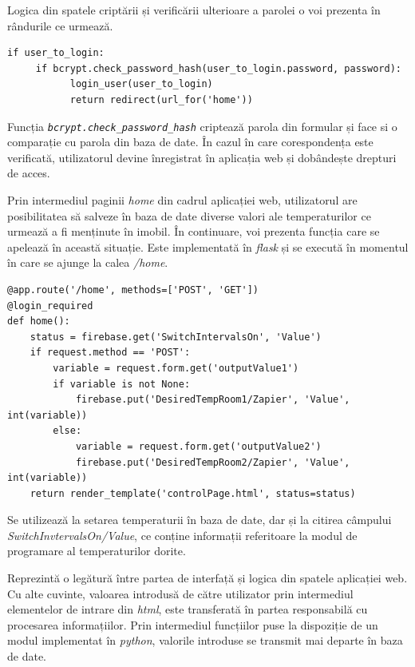 	Logica din spatele criptării și verificării ulterioare a parolei o voi prezenta în rândurile ce urmează.

\vspace{3em}	
\begin{lstlisting}	
if user_to_login:
     if bcrypt.check_password_hash(user_to_login.password, password):
           login_user(user_to_login)
           return redirect(url_for('home'))
\end{lstlisting}
\vspace{1em} 	

	Funcția \textit{\texttt{bcrypt.check\_password\_hash}} criptează parola din formular și face si o comparație cu parola din baza de date. În cazul în care corespondența este verificată, utilizatorul devine înregistrat în aplicația web și dobândește drepturi de acces.
  
\vspace{2em}

	Prin intermediul paginii \textit{home} din cadrul aplicației web, utilizatorul are posibilitatea să salveze în baza de date diverse valori ale temperaturilor ce urmează a fi menținute în imobil. În continuare, voi prezenta funcția care se apelează în această situație. Este implementată în \textit{flask} și se execută în momentul în care se ajunge la calea \textit{/home}. 

\vspace{1em}
\begin{lstlisting}
@app.route('/home', methods=['POST', 'GET'])
@login_required
def home():
    status = firebase.get('SwitchIntervalsOn', 'Value')
    if request.method == 'POST':
        variable = request.form.get('outputValue1')
        if variable is not None:
            firebase.put('DesiredTempRoom1/Zapier', 'Value', int(variable))
        else:
            variable = request.form.get('outputValue2')
            firebase.put('DesiredTempRoom2/Zapier', 'Value', int(variable))
    return render_template('controlPage.html', status=status)
\end{lstlisting}
\vspace{2em} 


	 Se utilizează la setarea temperaturii în baza de date, dar și la citirea câmpului \textit{SwitchInvtervalsOn/Value}, ce conține informații referitoare la modul de programare al temperaturilor dorite. 

	Reprezintă o legătură între partea de interfață și logica din spatele aplicației web. Cu alte cuvinte, valoarea introdusă de către utilizator prin intermediul elementelor de intrare din \textit{html}, este transferată în partea responsabilă cu procesarea informațiilor. Prin intermediul funcțiilor puse la dispoziție de un modul implementat în \textit{python}, valorile introduse se transmit mai departe în baza de date.

